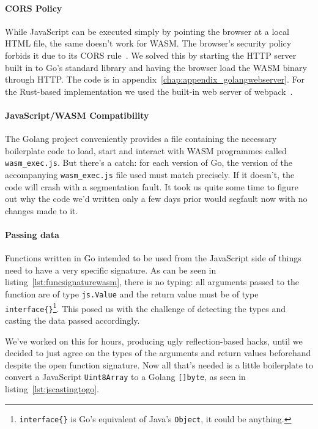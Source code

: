 \paragraph{CORS Policy} While JavaScript can be executed simply by pointing the browser at a local \gls{HTML} file, the same doesn't work for \gls{WASM}.
The browser's security policy forbids it due to its \gls{CORS} rule~\cite{cors}.
We solved this by starting the \gls{HTTP} server built in to Go's standard library and having the browser load the \gls{WASM} binary through \gls{HTTP}.
The code is in appendix~\ref{chap:appendix_golangwebserver}.
For the Rust-based implementation we used the built-in web server of webpack~\cite{webpack}.

\paragraph{JavaScript/WASM Compatibility} The Golang project conveniently provides a file containing the necessary boilerplate code to load, start and interact with \gls{WASM} programmes called \texttt{wasm\_exec.js}.
But there's a catch: for each version of Go, the version of the accompanying \texttt{wasm\_exec.js} file used must match precisely.
If it doesn't, the code will crash with a segmentation fault.
It took us quite some time to figure out why the code we'd written only a few days prior would segfault now with no changes made to it.

\paragraph{Passing data} Functions written in Go intended to be used from the JavaScript side of things need to have a very specific signature.
As can be seen in listing~\ref{lst:funcsignaturewasm}, there is no typing: all arguments passed to the function are of type \texttt{js.Value} and the return value must be of type \texttt{interface\{\}}\footnote{\texttt{interface\{\}} is Go's equivalent of Java's \texttt{Object}, it could be anything.}.
This posed us with the challenge of detecting the types and casting the data passed accordingly.



We've worked on this for hours, producing ugly reflection-based hacks, until we decided to just agree on the types of the arguments and return values beforehand despite the open function signature.
Now all that's needed is a little boilerplate to convert a JavaScript \texttt{Uint8Array} to a Golang \texttt{[]byte}, as seen in listing~\ref{lst:jscastingtogo}.

